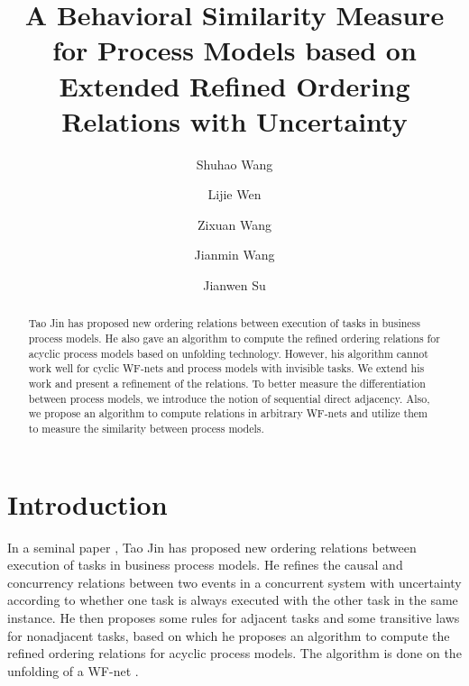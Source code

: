\documentclass{llncs}
\begin{document}
\frontmatter 
\pagestyle{headings}

\mainmatter
\title{A Behavioral Similarity Measure for Process Models based on Extended Refined Ordering Relations with Uncertainty}

\author[$\$$]{Shuhao Wang}
\author[$\$$]{Lijie Wen}
\author[$\$$]{Zixuan Wang}
\author[$\$$]{Jianmin Wang}
\author[$\#$]{Jianwen Su}
\institute{}

\maketitle

\begin{abstract}
Tao Jin has proposed new ordering relations between execution of tasks in business process models. He also gave an algorithm to compute the refined ordering relations for acyclic process models based on unfolding technology. However, his algorithm cannot work well for cyclic WF-nets and process models with invisible tasks. We extend his work and present a refinement of the relations. To better measure the differentiation between process models, we introduce the notion of sequential direct adjacency. Also, we propose an algorithm to compute relations in arbitrary WF-nets and utilize them to measure the similarity between process models.
\end{abstract}

\section{Introduction}\label{sec:introduction}

In a seminal paper \cite{jin2014computing}, Tao Jin has proposed new ordering relations between execution of tasks in business process models. He refines the causal and concurrency relations between two events in a concurrent system with uncertainty according to whether one task is always executed with the other task in the same instance. He then proposes some rules for adjacent tasks and some transitive laws for nonadjacent tasks, based on which he proposes an algorithm to compute the refined ordering relations for acyclic process models. The algorithm is done on the unfolding of a WF-net \cite{mcmillan1995technique,esparza1996improvement}.
\end{document}
